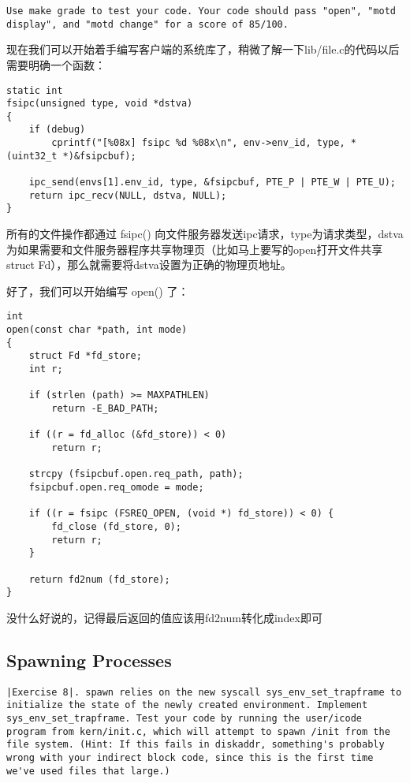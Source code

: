 \documentclass{article}
\newcommand{\funcname}[1]{{\ttfamily \small #1}}
\begin{document}
\begin{CJK*}{UTF8}{gkai}
\begin{lstlisting}[style=exercise]
Use make grade to test your code. Your code should pass "open", "motd display", and "motd change" for a score of 85/100.
\end{lstlisting}

现在我们可以开始着手编写客户端的系统库了，稍微了解一下lib/file.c的代码以后需要明确一个函数：

\begin{lstlisting}[style=ccode, title={\scriptsize \ttfamily \bfseries lib/file.c: fsipc()}]
static int
fsipc(unsigned type, void *dstva)
{
	if (debug)
		cprintf("[%08x] fsipc %d %08x\n", env->env_id, type, *(uint32_t *)&fsipcbuf);

	ipc_send(envs[1].env_id, type, &fsipcbuf, PTE_P | PTE_W | PTE_U);
	return ipc_recv(NULL, dstva, NULL);
}
\end{lstlisting}

所有的文件操作都通过 \funcname{fsipc()} 向文件服务器发送ipc请求，type为请求类型，dstva为如果需要和文件服务器程序共享物理页（比如马上要写的open打开文件共享struct Fd），那么就需要将dstva设置为正确的物理页地址。

好了，我们可以开始编写 \funcname{open()} 了：


\begin{lstlisting}[style=ccode, title={\scriptsize \ttfamily \bfseries lib/file.c: open()}]
int
open(const char *path, int mode)
{
    struct Fd *fd_store;
    int r;

    if (strlen (path) >= MAXPATHLEN)
        return -E_BAD_PATH;

    if ((r = fd_alloc (&fd_store)) < 0)
        return r;

    strcpy (fsipcbuf.open.req_path, path);
    fsipcbuf.open.req_omode = mode;

    if ((r = fsipc (FSREQ_OPEN, (void *) fd_store)) < 0) {
        fd_close (fd_store, 0);
        return r;
    }

    return fd2num (fd_store);
}
\end{lstlisting}

没什么好说的，记得最后返回的值应该用fd2num转化成index即可

\subsection{Spawning Processes}

\begin{lstlisting}[style=exercise]
|Exercise 8|. spawn relies on the new syscall sys_env_set_trapframe to initialize the state of the newly created environment. Implement sys_env_set_trapframe. Test your code by running the user/icode program from kern/init.c, which will attempt to spawn /init from the file system. (Hint: If this fails in diskaddr, something's probably wrong with your indirect block code, since this is the first time we've used files that large.)


\end{lstlisting}
\end{CJK*}
\end{document}
